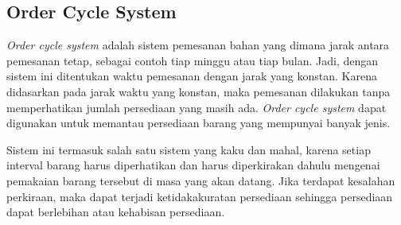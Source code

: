 \subsection{Order Cycle System}
	
	\textit{Order cycle system} adalah sistem pemesanan bahan yang dimana jarak antara pemesanan tetap, sebagai contoh tiap minggu atau tiap bulan. Jadi, dengan sistem ini ditentukan waktu pemesanan dengan jarak yang konstan. Karena didasarkan pada jarak waktu yang konstan, maka pemesanan dilakukan tanpa memperhatikan jumlah persediaan yang masih ada. \textit{Order cycle system} dapat digunakan untuk memantau persediaan barang yang mempunyai banyak jenis.

	Sistem ini termasuk salah satu sistem yang kaku dan mahal, karena setiap interval barang harus diperhatikan dan harus diperkirakan dahulu mengenai pemakaian barang tersebut di masa yang akan datang. Jika terdapat kesalahan perkiraan, maka dapat terjadi ketidakakuratan persediaan sehingga persediaan dapat berlebihan atau kehabisan persediaan.











